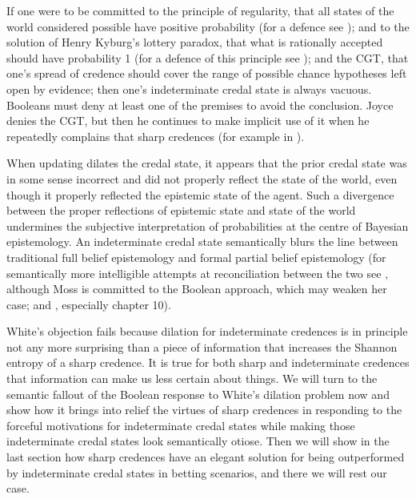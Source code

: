 \addtocounter{expls}{1}


If one were to be committed to the principle of
regularity, that all states of the world considered
possible have positive probability (for a defence see
); and to the solution of
Henry Kyburg's lottery paradox, that what is rationally
accepted should have probability 1 (for a defence of
this principle see );
and the CGT, that one's spread of credence should cover
the range of possible chance hypotheses left open by
evidence; then one's indeterminate credal state is
always vacuous. Booleans must deny at least one of the
premises to avoid the conclusion. Joyce denies the CGT,
but then he continues to make implicit use of it when
he repeatedly complains that sharp credences
 (for example in
).

When updating dilates the credal state, it appears that
the prior credal state was in some sense incorrect and
did not properly reflect the state of the world, even
though it properly reflected the epistemic state of the
agent. Such a divergence between the proper reflections
of epistemic state and state of the world undermines
the subjective interpretation of probabilities at the
centre of Bayesian epistemology. An indeterminate
credal state semantically blurs the line between
traditional full belief epistemology and formal partial
belief epistemology (for semantically more intelligible
attempts at reconciliation between the two see
, although Moss is committed to the
Boolean approach, which may weaken her case; and
, especially chapter 10).

White's objection fails because dilation for
indeterminate credences is in principle not any more
surprising than a piece of information that increases
the Shannon entropy of a sharp credence. It is true for
both sharp and indeterminate credences that information
can make us less certain about things. We will turn to
the semantic fallout of the Boolean response to White's
dilation problem now and show how it brings into relief
the virtues of sharp credences in responding to the
forceful motivations for indeterminate credal states
while making those indeterminate credal states look
semantically otiose. Then we will show in the last
section how sharp credences have an elegant solution
for being outperformed by indeterminate credal states
in betting scenarios, and there we will rest our case.

